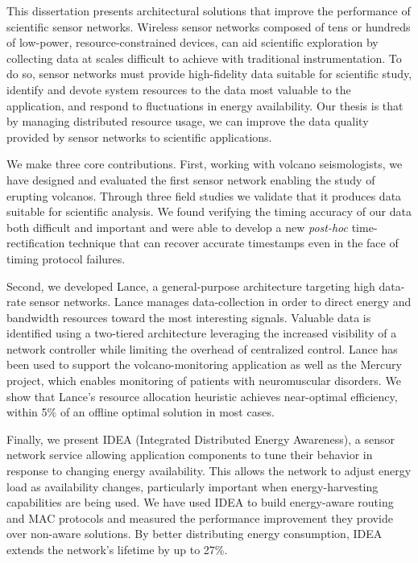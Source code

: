\hspace{0.25in}

This dissertation presents architectural solutions that improve the
performance of scientific sensor networks. Wireless sensor networks composed
of tens or hundreds of low-power, resource-constrained devices, can aid
scientific exploration by collecting data at scales difficult to achieve with
traditional instrumentation. To do so, sensor networks must provide
high-fidelity data suitable for scientific study, identify and devote system
resources to the data most valuable to the application, and respond to
fluctuations in energy availability. Our thesis is that by managing
distributed resource usage, we can improve the data quality provided by
sensor networks to scientific applications.

We make three core contributions. First, working with volcano seismologists,
we have designed and evaluated the first sensor network enabling the
study of erupting volcanos. Through three field studies we validate that
it produces data suitable for scientific analysis. We found verifying the
timing accuracy of our data both difficult and important and were able
to develop a new \textit{post-hoc} time-rectification technique that can
recover accurate timestamps even in the face of timing protocol failures.

Second, we developed Lance, a general-purpose architecture targeting high
data-rate sensor networks. Lance manages data-collection in order to direct
energy and bandwidth resources toward the most interesting signals. Valuable
data is identified using a two-tiered architecture leveraging the increased
visibility of a network controller while limiting the overhead of centralized
control. Lance has been used to support the volcano-monitoring application as
well as the Mercury project, which enables monitoring of patients with
neuromuscular disorders. We show that Lance's resource allocation heuristic
achieves near-optimal efficiency, within 5\% of an offline optimal solution
in most cases.

Finally, we present IDEA (Integrated Distributed Energy Awareness), a sensor
network service allowing application components to tune their behavior in
response to changing energy availability. This allows the network to adjust
energy load as availability changes, particularly important when
energy-harvesting capabilities are being used. We have used IDEA to build
energy-aware routing and MAC protocols and measured the performance
improvement they provide over non-aware solutions. By better distributing
energy consumption, IDEA extends the network's lifetime by up to 27\%.
